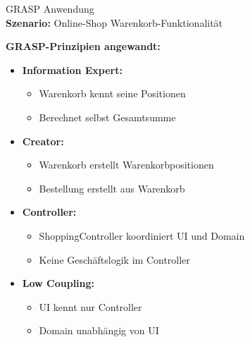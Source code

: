 \begin{example2}{GRASP Anwendung}\\
\textbf{Szenario:} Online-Shop Warenkorb-Funktionalität

\textbf{GRASP-Prinzipien angewandt:}
\begin{itemize}
    \item \textbf{Information Expert:}
    \begin{itemize}
        \item Warenkorb kennt seine Positionen
        \item Berechnet selbst Gesamtsumme
    \end{itemize}
    
    \item \textbf{Creator:}
    \begin{itemize}
        \item Warenkorb erstellt Warenkorbpositionen
        \item Bestellung erstellt aus Warenkorb
    \end{itemize}
    
    \item \textbf{Controller:}
    \begin{itemize}
        \item ShoppingController koordiniert UI und Domain
        \item Keine Geschäftslogik im Controller
    \end{itemize}
    
    \item \textbf{Low Coupling:}
    \begin{itemize}
        \item UI kennt nur Controller
        \item Domain unabhängig von UI
    \end{itemize}
\end{itemize}
\end{example2}



